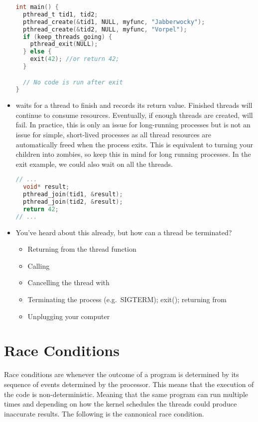 \begin{itemize}
\begin{lstlisting}[language=C]
int main() {
  pthread_t tid1, tid2;
  pthread_create(&tid1, NULL, myfunc, "Jabberwocky");
  pthread_create(&tid2, NULL, myfunc, "Vorpel");
  if (keep_threads_going) {
    pthread_exit(NULL); 
  } else {
    exit(42); //or return 42;
  }

  // No code is run after exit
}
\end{lstlisting}

\item {} waits for a thread to finish and records its return value.
Finished threads will continue to consume resources.
Eventually, if enough threads are created,  will fail.
In practice, this is only an issue for long-running processes but is not an issue for simple, short-lived processes as all thread resources are automatically freed when the process exits.
This is equivalent to turning your children into zombies, so keep this in mind for long running processes. In the exit example, we could also wait on all the threads.

\begin{lstlisting}[language=C]
// ...
  void* result;
  pthread_join(tid1, &result);
  pthread_join(tid2, &result); 
  return 42;
// ...
\end{lstlisting}

\item You've heard about this already, but how can a thread be terminated? 
\begin{itemize}
\item Returning from the thread function 
\item Calling  
\item Cancelling the thread with  
\item Terminating the process (e.g.~SIGTERM); exit(); returning from 
\item Unplugging your computer
\end{itemize}

\end{itemize}

\section{Race Conditions}

Race conditions are whenever the outcome of a program is determined by its sequence of events determined by the processor.
This means that the execution of the code is non-deterministic.
Meaning that the same program can run multiple times and depending on how the kernel schedules the threads could produce inaccurate results.
The following is the cannonical race condition.

